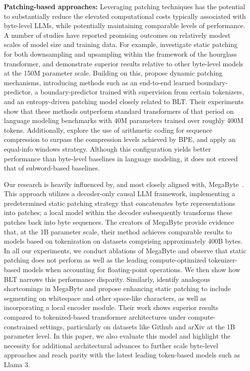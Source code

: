 \textbf{Patching-based approaches:} Leveraging patching techniques has the potential to substantially reduce the elevated computational costs typically associated with byte-level LLMs, while potentially maintaining comparable levels of performance. A number of studies have reported promising outcomes on relatively modest scales of model size and training data. For example, \cite{nawrot-etal-2022-hierarchical} investigate static patching for both downsampling and upsampling within the framework of the hourglass transformer, and demonstrate superior results relative to other byte-level models at the 150M parameter scale. Building on this, \cite{nawrot-etal-2023-efficient} propose dynamic patching mechanisms, introducing methods such as an end-to-end learned boundary-predictor, a boundary-predictor trained with supervision from certain tokenizers, and an entropy-driven patching model closely related to {\textsc BLT}. Their experiments show that these methods outperform standard transformers of that period on language modeling benchmarks with 40M parameters trained over roughly 400M tokens. Additionally, \cite{lester2024training} explore the use of arithmetic coding for sequence compression to surpass the compression levels achieved by BPE, and apply an equal-info windows strategy. Although this configuration yields better performance than byte-level baselines in language modeling, it does not exceed that of subword-based baselines.

Our research is heavily influenced by, and most closely aligned with, MegaByte~\citep{yu2023megabyte}. This approach utilizes a decoder-only causal LLM framework, implementing a predetermined static patching strategy that concatenates byte representations into patches; a local model within the decoder subsequently transforms these patches back into byte sequences. The creators of MegaByte provide evidence that, at the 1B parameter scale, their method achieves comparable results to models based on tokenization on datasets comprising approximately 400B bytes. In all our experiments, we conduct ablations of MegaByte and observe that static patching does not perform as well as the leading compute-optimized tokenizer-based models when accounting for floating-point operations. We then show how {\textsc BLT} narrows this performance disparity. Similarly, \cite{slagle2024spacebyte} identify analogous shortcomings in MegaByte and propose enhancing static patching to include segmenting on whitespace and other space-like characters, as well as incorporating a local encoder module. Their work shows superior results compared to tokenized-based transformer architectures under compute-constrained settings, particularly on datasets like Github and arXiv at the 1B parameter level. In this paper, we also evaluate this model and highlight the necessity for additional architectural advances to further scale byte-level approaches and reach parity with the latest leading token-based models such as Llama 3.

